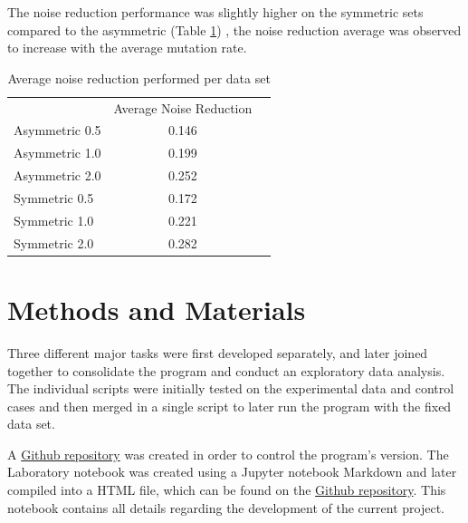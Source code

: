 \documentclass[12pt]{article}
\begin{document}
The noise reduction performance was slightly higher on the symmetric sets compared to the asymmetric (Table \ref{table:averg}) , the noise reduction average was observed to increase with the average mutation rate. 



\begin{table}[H]
	\centering
	\small\addtolength{\tabcolsep}{-2pt}
	\caption{Average noise reduction performed per data set}
	\begin{tabular}{l|c|l}
		\cline{2-2}
		\textbf{} & \multicolumn{1}{l|}{Average Noise Reduction} &  \\ \cline{1-2}
		\multicolumn{1}{|l|}{Asymmetric 0.5} & 0.146 &  \\ \cline{1-2}
		\multicolumn{1}{|l|}{Asymmetric 1.0} & 0.199 &  \\ \cline{1-2}
		\multicolumn{1}{|l|}{Asymmetric 2.0} & 0.252 &  \\ \cline{1-2}
		\multicolumn{1}{|l|}{Symmetric 0.5} & 0.172 &  \\ \cline{1-2}
		\multicolumn{1}{|l|}{Symmetric 1.0} & 0.221 &  \\ \cline{1-2}
		\multicolumn{1}{|l|}{Symmetric 2.0} & 0.282 &  \\ \cline{1-2}
	\end{tabular}

\label{table:averg}
\end{table}


\section{Methods and Materials}
Three different major tasks were first developed separately, and later joined together to consolidate the program and conduct an exploratory data analysis. The individual scripts were initially tested on the experimental data and control cases and then merged in a single script to later run the program with the fixed data set.\\

\clearpage

A \href{https://github.com/msarrias/protein_multial_noise_reduction}{Github repository} was created in order to control the program's version. The Laboratory notebook was created using a Jupyter notebook Markdown and later compiled into a HTML file, which can be found on the \href{https://github.com/msarrias/protein_multial_noise_reduction/tree/master/results}{Github repository}. This notebook contains all details regarding the development of the current project.\\
\end{document}
